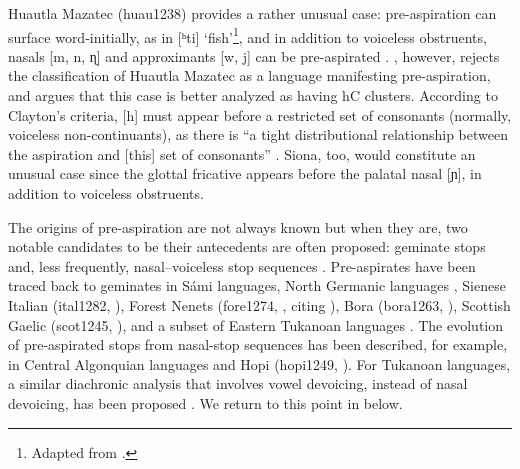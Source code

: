 \documentclass[output=paper]{langscibook}
\begin{document}
Huautla Mazatec (huau1238) provides a rather unusual case: pre-aspiration can surface word-initially, as in [ʰti] ‘fish’\footnote{Adapted from \citet[80]{PikePike:1947}.}, and in addition to voiceless obstruents, nasals [m, n, ɳ] and approximants [w, j] can be pre-aspirated \citep{Silverman:2003}. \citet[32--34]{Clayton:2010}, however, rejects the classification of Huautla Mazatec as a language manifesting pre-aspiration, and argues that this case is better analyzed as having hC clusters. According to Clayton’s criteria, [h] must appear before a restricted set of consonants (normally, voiceless non-continuants), as there is “a tight distributional relationship between the aspiration and [this] set of consonants” \citep[9]{Clayton:2010}. Siona, too, would constitute an unusual case since the glottal fricative appears before the palatal nasal [ɲ], in addition to voiceless obstruents.

The origins of pre-aspiration are not always known but when they are, two notable candidates to be their antecedents are often proposed: geminate stops and, less frequently, nasal–voiceless stop sequences \citep{Clayton:2010, Helgason:2002}. Pre-aspirates have been traced back to geminates in Sámi languages, North Germanic languages \citep{Helgason:2002}, Sienese Italian (ital1282, \citealp{Stevens:2004, StevensHajek:2007}), Forest Nenets (fore1274, \citealt{Helgason:2002}, citing \citealt{Hansson1997}), Bora (bora1263, \citealp{Aschmann:1993}), Scottish Gaelic (scot1245, \citealp{NiChasaideODochartaigh:1984}), and a subset of Eastern Tukanoan languages \citep{Stenzel:2013}. The evolution of pre-aspirated stops from nasal-stop sequences has been described, for example, in Central Algonquian languages \citep{Bloomfield:1925} and Hopi (hopi1249, \citealp{Manaster-Ramer:1986}). For Tukanoan languages, a similar diachronic analysis that involves vowel devoicing, instead of nasal devoicing, has been proposed \citep{Waltz:2002}. We return to this point in  below.
\end{document}
